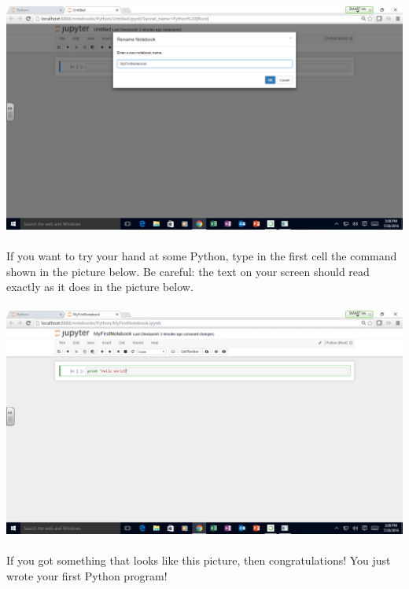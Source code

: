 \documentclass[]{article}
\begin{document}
\paragraph{}
\begin{centering}
    \centerline{\includegraphics[scale=0.35]{Screenshot_22.png}}
\end{centering}

\paragraph{}
If you want to try your hand at some Python, type in the first cell the command shown in the picture below. Be careful: the text on your screen should read exactly as it does in the picture below.
\paragraph{}
\begin{centering}
    \centerline{\includegraphics[scale=0.35]{Screenshot_23.png}}
\end{centering}

\paragraph{}
If you got something that looks like this picture, then congratulations! You just wrote your first Python program!
\end{document}
